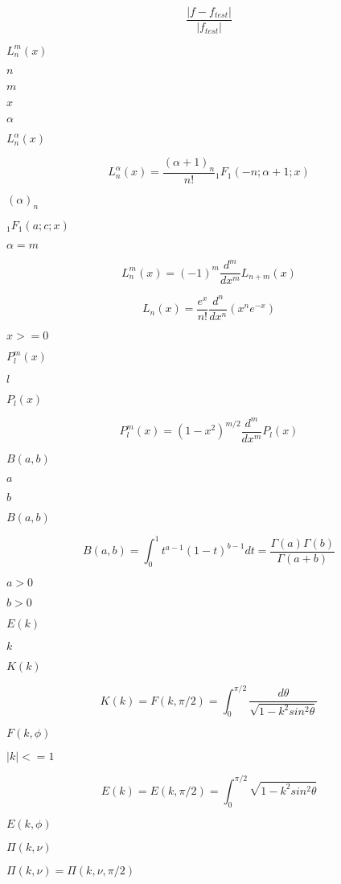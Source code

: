 \documentclass{article}
\begin{document}
\[ \frac{|f - f_{test}|}{|f_{test}|} \]
\pagebreak

$ L_n^m(x) $
\pagebreak

$ n $
\pagebreak

$ m $
\pagebreak

$ x $
\pagebreak

$ \alpha $
\pagebreak

$ L_n^\alpha(x) $
\pagebreak

\[ L_n^\alpha(x) = \frac{(\alpha + 1)_n}{n!} {}_1F_1(-n; \alpha + 1; x) \]
\pagebreak

$ (\alpha)_n $
\pagebreak

$ {}_1F_1(a; c; x) $
\pagebreak

$ \alpha = m $
\pagebreak

\[ L_n^m(x) = (-1)^m \frac{d^m}{dx^m} L_{n + m}(x) \]
\pagebreak

\[ L_n(x) = \frac{e^x}{n!} \frac{d^n}{dx^n} (x^ne^{-x}) \]
\pagebreak

$ x >= 0 $
\pagebreak

$ P_l^m(x) $
\pagebreak

$ l $
\pagebreak

$ P_l(x) $
\pagebreak

\[ P_l^m(x) = (1 - x^2)^{m/2}\frac{d^m}{dx^m}P_l(x) \]
\pagebreak

$ B(a,b) $
\pagebreak

$ a $
\pagebreak

$ b $
\pagebreak

$B(a,b)$
\pagebreak

\[ B(a,b) = \int_0^1 t^{a - 1} (1 - t)^{b - 1} dt = \frac{\Gamma(a)\Gamma(b)}{\Gamma(a+b)} \]
\pagebreak

$ a > 0 $
\pagebreak

$ b > 0 $
\pagebreak

$ E(k) $
\pagebreak

$ k $
\pagebreak

$ K(k) $
\pagebreak

\[ K(k) = F(k,\pi/2) = \int_0^{\pi/2}\frac{d\theta} {\sqrt{1 - k^2 sin^2\theta}} \]
\pagebreak

$ F(k,\phi) $
\pagebreak

$ |k| <= 1 $
\pagebreak

\[ E(k) = E(k,\pi/2) = \int_0^{\pi/2}\sqrt{1 - k^2 sin^2\theta} \]
\pagebreak

$ E(k,\phi) $
\pagebreak

$ \Pi(k,\nu) $
\pagebreak

$ \Pi(k,\nu) = \Pi(k,\nu,\pi/2) $
\pagebreak
\end{document}
